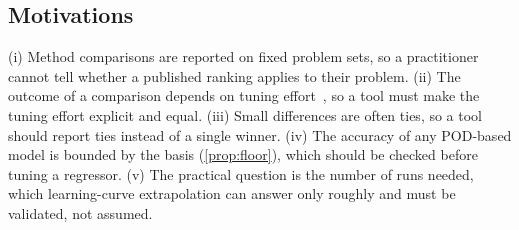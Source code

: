 \subsection{Motivations}
(i) Method comparisons are reported on fixed problem sets, so a practitioner cannot tell whether a published ranking applies to their problem. (ii) The outcome of a comparison depends on tuning effort~\cite{mcgreivy2024,dodge2019}, so a tool must make the tuning effort explicit and equal. (iii) Small differences are often ties, so a tool should report ties instead of a single winner. (iv) The accuracy of any POD-based model is bounded by the basis (\cref{prop:floor}), which should be checked before tuning a regressor. (v) The practical question is the number of runs needed, which learning-curve extrapolation can answer only roughly and must be validated, not assumed.
